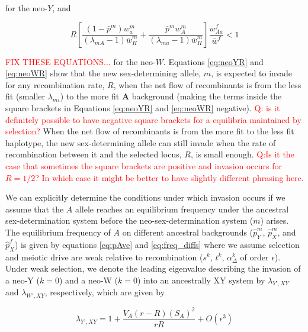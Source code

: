 \documentclass[12pt]{article}
\begin{document}
\noindent
for the neo-$Y$, and 

\noindent
\begin{equation}\label{eq:neoWR}
R \left[  
\frac{(1 - \bar{p}^m) w^m_{a}}{(\lambda_{mA}-1)\bar{w}_{H}^{m}} + 
\frac{\bar{p}^m w^m_{A}}{(\lambda_{ma}-1)\bar{w}_{H}^{m}} \right] 
\frac{w^f_{Aa}}{\bar{w}^f} < 1
\end{equation}

\noindent
\textcolor{red}{FIX THESE EQUATIONS...}
for the neo-$W$. Equations \eqref{eq:neoYR} and \eqref{eq:neoWR} show that the new sex-determining allele, $m$, is expected to invade for any recombination rate, $R$, when the net flow of recombinants is from the less fit (smaller $\lambda_{mi}$) to the more fit \textbf{A} background (making the terms inside the square brackets in Equations \ref{eq:neoYR} and \ref{eq:neoWR} negative). \textcolor{red}{Q: is it definitely possible to have negative square brackets for a equilibria maintained by selection?}
When the net flow of recombinants is from the more fit to the less fit haplotype, the new sex-determining allele can still invade when the rate of recombination between it and the selected locus, $R$, is small enough. \textcolor{red}{Q:Is it the case that sometimes the square brackets are positive and invasion occurs for $R=1/2$? In which case it might be better to have slightly different phrasing here.}

We can explicitly determine the conditions under which invasion occurs if we assume that the $A$ allele reaches an equilibrium frequency under the ancestral sex-determination system before the neo-sex-determination system ($m$) arises. 
The equilibrium  frequency of $A$ on different ancestral backgrounds ($\hat{p}^m_Y$, $\hat{p}^m_X$, and $\hat{p}^f_X$) is given by equations \eqref{eq:pAve} and \eqref{eq:freq_diffs} where we assume selection and meiotic drive are weak relative to recombination ($s^k$, $t^k$, $\alpha_{\Delta}^k$ of order $\epsilon$). 
Under weak selection, we denote the leading eigenvalue describing the invasion of a neo-Y ($k=0$) and a neo-W ($k=0$) into an ancestrally XY system by $\lambda_{Y',XY}$ and $\lambda_{W',XY}$, respectively, which are given by

\begin{equation}
\lambda_{Y',XY} =1+ \frac{V_{A} \left( r-R \right)(S_{A})^2 }{r R}+O\left(\epsilon^3 \right) 
\label{eq:lambda_neoY}
\end{equation}
\end{document}
